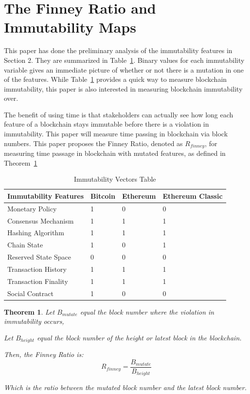 \documentclass{article}
\newtheorem{theorem}{Theorem}
\begin{document}
\section{The Finney Ratio and Immutability Maps}
This paper has done the preliminary analysis of the immutability features in Section 2. They are summarized in Table~\ref{tab2:table}. Binary values for each immutability variable gives an immediate picture of whether or not there is a mutation in one of the features. While Table~\ref{tab2:table} provides a quick way to measure blockchain immutability, this paper is also interested in measuring blockchain immutability over. 

The benefit of using time is that stakeholders can actually see how long each feature of a blockchain stays immutable before there is a violation in immutability. This paper will measure time passing in blockchain via block numbers. This paper proposes the Finney Ratio, denoted as $R_{finney}$, for measuring time passage in blockchain with mutated features, as defined in Theorem~\ref{th4:theorem}

\begin{table}
 \caption{Immutability Vectors Table}
  \centering
  \begin{tabular}{llll}
    \toprule
    \cmidrule(r){1-2}
    Immutability Features     & Bitcoin     & Ethereum & Ethereum Classic \\
    \midrule
    Monetary Policy & 1 & 0 & 0     \\
    Consensus Mechanism & 1 & 1 & 1     \\
    Hashing Algorithm & 1 & 1 & 1     \\
    Chain State & 1 & 0 & 1     \\
    Reserved State Space & 0 & 0 & 0     \\
    Transaction History & 1 & 1 & 1     \\
    Transaction Finality & 1 & 1 & 1     \\
    Social Contract & 1 & 0 & 0     \\
    \bottomrule
  \end{tabular}
  \label{tab2:table}
\end{table}

\begin{theorem}
Let $B_{mutate}$ equal the block number where the violation in immutability occurs,

Let $B_{height}$ equal the block number of the height or latest block in the blockchain.

Then, the Finney Ratio is: 
\begin{equation}
    R_{finney}=\frac{B_{mutate}}{B_{height}}
\end{equation} 

Which is the ratio between the mutated block number and the latest block number.
\label{th4:theorem}
\end{theorem}
\end{document}
